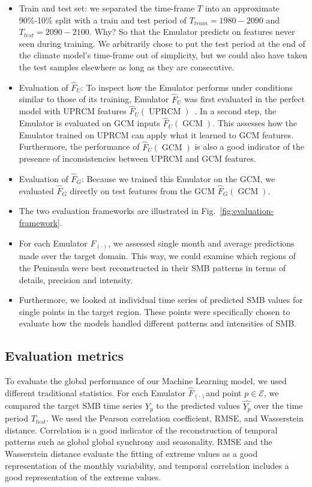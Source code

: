\documentclass[a4paper,11pt,oneside]{report}
\begin{document}
\begin{itemize}
    \item Train and test set: we separated the time-frame $T$ into an approximate 90\%-10\% split with a train and test period of $T_{train} = 1980-2090$ and $T_{test} = 2090-2100$. Why? So that the Emulator predicts on features never seen during training.
    We arbitrarily chose to put the test period at the end of the climate model's time-frame out of simplicity, but we could also have taken the test samples elsewhere as long as they are consecutive. 
    \item Evaluation of $\hat{F}_U$: To inspect how the Emulator performs under conditions similar to those of its training, Emulator $\hat{F}_U$ was first evaluated in the perfect model with UPRCM features $\hat{F}_U(\operatorname{UPRCM})$~\cite{Doury}. In a second step, the Emulator is evaluated on GCM inputs $\hat{F}_U(\operatorname{GCM})$. This assesses how the Emulator trained on UPRCM can apply what it learned to GCM features. Furthermore, the performance of $\hat{F}_U(\operatorname{GCM})$ is also a good indicator of the presence of inconsistencies between UPRCM and GCM features. 
    \item Evaluation of $\hat{F}_G$: Because we trained this Emulator on the GCM, we evaluated $\hat{F}_G$ directly on test features from the GCM $\hat{F}_G(\operatorname{GCM})$. 
    \item The two evaluation frameworks are illustrated in Fig.~\ref{fig:evaluation-framework}.
    \item For each Emulator $\hat{F}_{(\cdot)}$, we assessed single month and average predictions made over the target domain. This way, we could examine which regions of the Peninsula were best reconstructed in their SMB patterns in terms of details, precision and intensity. \item Furthermore, we looked at individual time series of predicted SMB values for single points in the target region. These points were specifically chosen to evaluate how the models handled different patterns and intensities of SMB.   
\end{itemize}

\subsection{Evaluation metrics}\label{subsec:evaluation-metrics} 

To evaluate the global performance of our Machine Learning model, we used different traditional statistics. For each Emulator $\hat{F}_{(\cdot)}$and point $p \in \mathcal{E}$, we compared the target SMB time series $Y_{p}$ to the predicted values $\widehat{Y_{p}}$ over the time period $T_{test}$. We used the Pearson correlation coefficient, RMSE, and Wasserstein distance. Correlation is a good indicator of the reconstruction of temporal patterns such as global global synchrony and seasonality. RMSE and the Wasserstein distance evaluate the fitting of extreme values as a good representation of the monthly variability, and temporal correlation includes a good representation of the extreme values. 
\end{document}

